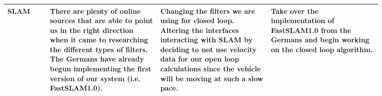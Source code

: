 \documentclass[10pt, onecolumn, draftclsnofoot, letterpaper,compsoc]{IEEEtran}
\begin{document}
\begin{tabular}{|p{0.1\linewidth}|p{0.26\linewidth}|p{0.26\linewidth}|p{0.26\linewidth}|}
\centering SLAM 
& %
There are plenty of online sources that are able to point us in the right direction when it came to researching the different types of filters. \newline
The Germans have already begun implementing the first version of our system (i.e. FastSLAM1.0). 
  
& %
Changing the filters we are using for closed loop. \newline
Altering the interfaces interacting with SLAM by deciding to not use velocity data for our open loop calculations since the vehicle will be moving at such a slow pace. 
  
& %
Take over the implementation of FastSLAM1.0 from the Germans and begin working on the closed loop algorithm. 

\\ \hline
\end{tabular}
\end{document}
